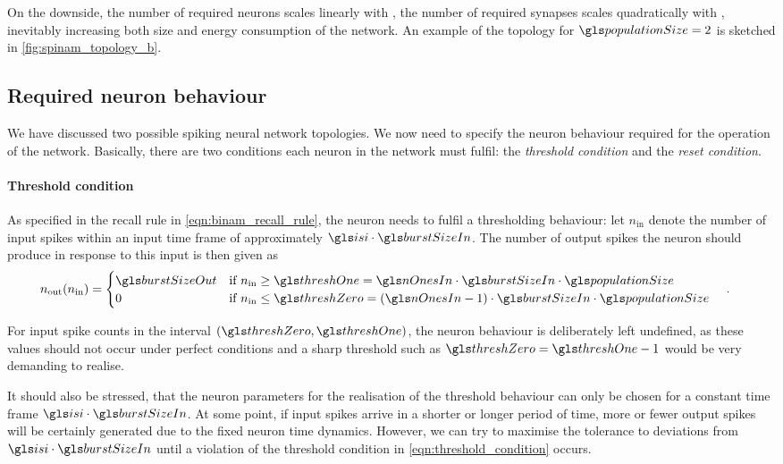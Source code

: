 On the downside, the number of required neurons scales linearly with \populationSize, the number of required synapses scales quadratically with \populationSize, inevitably increasing both size and energy consumption of the network. An example of the topology for $\populationSize = 2$ is sketched in \vref{fig:spinam_topology_b}.

\subsection{Required neuron behaviour}
\label{sec:required_neuron_behaviour}

We have discussed two possible \BiNAM spiking neural network topologies. We now need to specify the neuron behaviour required for the operation of the network. Basically, there are two conditions each neuron in the network must fulfil: the \emph{threshold condition} and the \emph{reset condition}.

\paragraph{Threshold condition}
As specified in the \BiNAM recall rule in \cref{eqn:binam_recall_rule}, the neuron needs to fulfil a thresholding behaviour: let $n_{\mathrm{in}}$ denote the number of input spikes within an input time frame of approximately $\isi \cdot \burstSizeIn$. The number of output spikes the neuron should produce in response to this input is then given as
\begin{align}
	n_{\mathrm{out}}(n_{\mathrm{in}}) &= \begin{cases}
							\burstSizeOut
								& \text{if } n_{\mathrm{in}} \geq \threshOne = \nOnesIn \cdot \burstSizeIn \cdot \populationSize \\
							0
								& \text{if } n_{\mathrm{in}} \leq \threshZero = (\nOnesIn - 1) \cdot \burstSizeIn \cdot \populationSize
	                    \end{cases} \;\;\;\;.
	\label{eqn:threshold_condition}
\end{align}

For input spike counts in the interval $(\threshZero, \threshOne)$, the neuron behaviour is deliberately left undefined, as these values should not occur under perfect conditions and a sharp threshold such as $\threshZero = \threshOne - 1$ would be very demanding to realise.

It should also be stressed, that the neuron parameters for the realisation of the threshold behaviour can only be chosen for a constant time frame $\isi \cdot \burstSizeIn$. At some point, if input spikes arrive in a shorter or longer period of time, more or fewer output spikes will be certainly generated due to the fixed neuron time dynamics. However, we can try to maximise the tolerance to deviations from $\isi \cdot \burstSizeIn$ until a violation of the threshold condition in \cref{eqn:threshold_condition} occurs.

